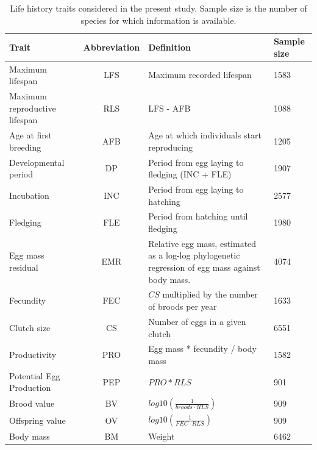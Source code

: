 \begin{table}
\caption[Life history traits]{Life history traits considered in the present
study. Sample size is the number of species for which information is
available.}\label{tab:table2.1}
\begin{tabular}{@{}p{2.5cm}cp{7.5cm}p{1.5cm}@{}}
\toprule
Trait                         & Abbreviation & Definition                                   & Sample size \\
\midrule
Maximum lifespan              & LFS          & Maximum recorded lifespan                    & 1583        \\
Maximum reproductive lifespan & RLS          & LFS - AFB                                    & 1088        \\
Age at first breeding         & AFB          & Age at which individuals start reproducing   & 1205        \\
Developmental period          & DP           & Period from egg laying to fledging (INC + FLE)           & 1907 \\
Incubation                    & INC          & Period from egg laying to hatching           & 2577        \\
Fledging                      & FLE          & Period from hatching until fledging          & 1980        \\
Egg mass residual             & EMR          & Relative egg mass, estimated as a log-log phylogenetic regression of egg mass against body mass. & 4074 \\
Fecundity                     & FEC          & $CS$ multiplied by the number of broods per year         & 1633 \\
Clutch size                   & CS           & Number of eggs in a given clutch             & 6551        \\
Productivity                  & PRO          & Egg mass * fecundity / body mass             & 1582        \\
Potential Egg Production      & PEP          & $PRO * RLS$                                  & 901         \\
Brood value                   & BV           & $log10\left(\tfrac{1}{ broods \cdot RLS } \right)$       & 909  \\
Offspring value               & OV           & $log10\left(\tfrac{1}{ FEC \cdot RLS } \right)$          & 909  \\
Body mass                     & BM           & Weight                                       & 6462        \\
\bottomrule
\end{tabular}
\end{table}


